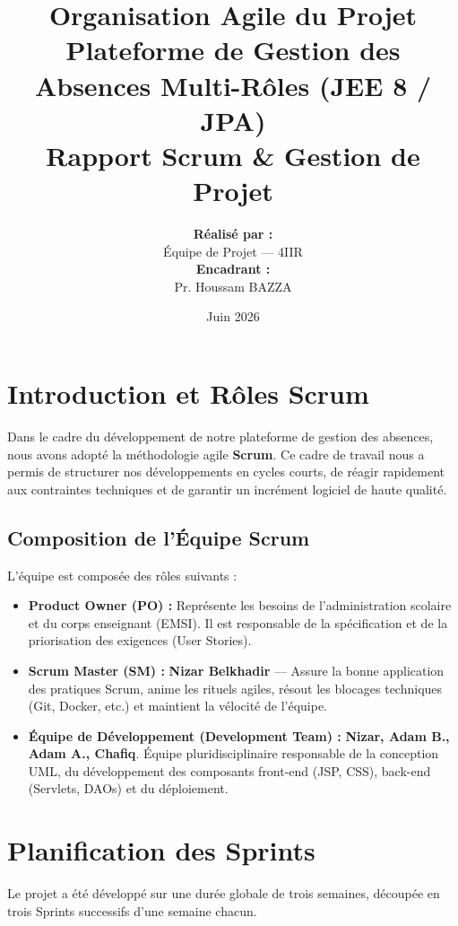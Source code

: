 \documentclass[12pt,a4paper]{article}
\title{
    \vspace{2cm}
    \textbf{\Huge Organisation Agile du Projet}\\[0.5cm]
    \Large Plateforme de Gestion des Absences Multi-Rôles (JEE 8 / JPA)\\[1cm]
    \large\textbf{Rapport Scrum \& Gestion de Projet}
    \vspace{1cm}
}
\author{
    \textbf{Réalisé par :}\\
    Équipe de Projet — 4IIR\\[0.5cm]
    \textbf{Encadrant :}\\
    Pr. Houssam BAZZA
}
\date{Juin 2026}
\begin{document}
\maketitle
\thispagestyle{empty}
\newpage

\section{Introduction et Rôles Scrum}
Dans le cadre du développement de notre plateforme de gestion des absences, nous avons adopté la méthodologie agile \textbf{Scrum}. Ce cadre de travail nous a permis de structurer nos développements en cycles courts, de réagir rapidement aux contraintes techniques et de garantir un incrément logiciel de haute qualité.

\subsection{Composition de l'Équipe Scrum}
L'équipe est composée des rôles suivants :
\begin{itemize}
    \item \textbf{Product Owner (PO) :} Représente les besoins de l'administration scolaire et du corps enseignant (EMSI). Il est responsable de la spécification et de la priorisation des exigences (User Stories).
    \item \textbf{Scrum Master (SM) :} \textbf{Nizar Belkhadir} — Assure la bonne application des pratiques Scrum, anime les rituels agiles, résout les blocages techniques (Git, Docker, etc.) et maintient la vélocité de l'équipe.
    \item \textbf{Équipe de Développement (Development Team) :} \textbf{Nizar, Adam B., Adam A., Chafiq}. Équipe pluridisciplinaire responsable de la conception UML, du développement des composants front-end (JSP, CSS), back-end (Servlets, DAOs) et du déploiement.
\end{itemize}

\newpage
\section{Planification des Sprints}
Le projet a été développé sur une durée globale de trois semaines, découpée en trois Sprints successifs d'une semaine chacun.
\end{document}
